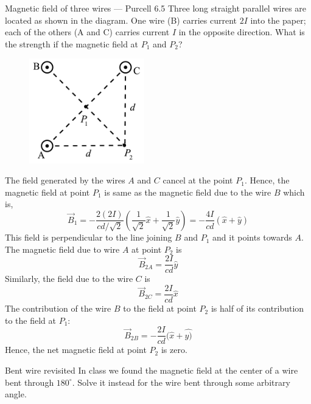 \documentclass[makesolutionspdf]{esg8022pset}
\begin{document}
\begin{problem}{Magnetic field of three wires --- Purcell 6.5}
Three long straight parallel wires are located as shown in the diagram. One wire (B) carries current $2 I$ into the paper;
 each of the others (A and C) carries current $I$ in the opposite direction. What is the strength if the magnetic field at $P_1$
  and $P_{2}$?
  
   \begin{figure}[ht]
    \centering
    \includegraphics[width = 5cm]{Threewires}
    \label{fig:threewire}
  \end{figure}
  
\end{problem}
\begin{solution}
The field generated by the wires $A$ and $C$ cancel at the point $P_{1}$. Hence, the magnetic field at point $P_{1}$ is same as the magnetic field due to the wire $B$ which is,
$$\vec{B}_{1} = -\frac{2 (2I)}{ c d/\sqrt{2}} \left( \frac{1}{\sqrt{2} } \hat{x}+\frac{1}{\sqrt{2} } \hat{y} \right) = -\frac{4I}{cd} ( \hat{x} +  \hat{y})$$
This field is perpendicular to the line joining $B$ and $P_{1}$ and it points towards $A$.\\
\noindent  The magnetic field due to wire $A$ at point $P_{2}$ is
$$\vec{B}_{2A} =\frac {2 I}{cd}  \hat{y}$$
Similarly, the field due to the wire $C$ is
$$\vec{B}_{2C} = \frac{2 I}{cd}  \hat{x}$$
The contribution of the wire $B$ to the field at point $P_{2}$ is half of its contribution to the field at $P_{1}$: 
$$\vec{B}_{2B} =  -\frac{2I}{cd} ( \hat{x} +  \hat{y)}$$
Hence, the net magnetic field at point $P_{2}$ is zero.
\end{solution}

\begin{problem}{Bent wire revisited}
In class we found the magnetic field at the center of a wire bent through $180^\circ$.
Solve it instead for the wire bent through some arbitrary angle.
\end{problem}
\end{document}
